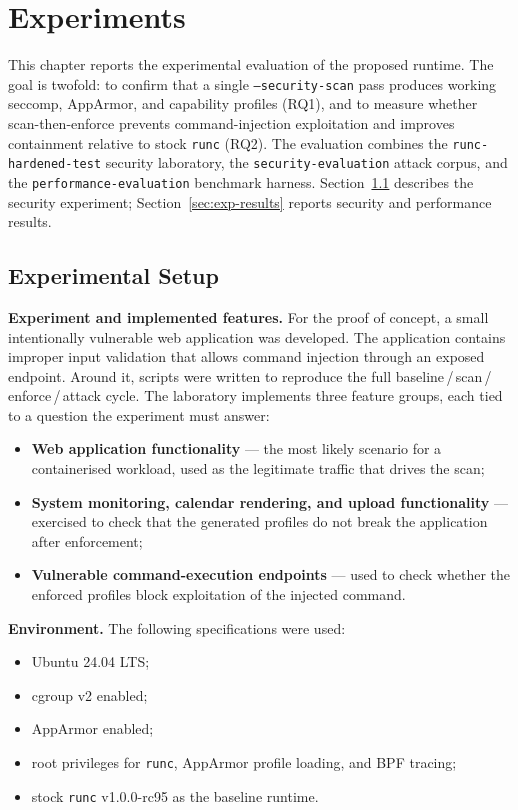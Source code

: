 
\chapter{Experiments}\label{ch:experiments}

This chapter reports the experimental evaluation of the proposed runtime. The goal is twofold: to confirm that a single \texttt{--security-scan} pass produces working seccomp, AppArmor, and capability profiles (RQ1), and to measure whether scan-then-enforce prevents command-injection exploitation and improves containment relative to stock \texttt{runc} (RQ2). The evaluation combines the \texttt{runc-hardened-test} security laboratory, the \texttt{security-evaluation} attack corpus, and the \texttt{performance-evaluation} benchmark harness. Section~\ref{sec:exp-setup} describes the security experiment; Section~\ref{sec:exp-results} reports security and performance results.

\section{Experimental Setup}\label{sec:exp-setup}

\textbf{Experiment and implemented features.} For the proof of concept, a small intentionally vulnerable web application was developed. The application contains improper input validation that allows command injection through an exposed endpoint. Around it, scripts were written to reproduce the full baseline\,/\,scan\,/\,enforce\,/\,attack cycle. The laboratory implements three feature groups, each tied to a question the experiment must answer:

\begin{itemize}
    \item \textbf{Web application functionality} --- the most likely scenario for a containerised workload, used as the legitimate traffic that drives the scan;
    \item \textbf{System monitoring, calendar rendering, and upload functionality} --- exercised to check that the generated profiles do not break the application after enforcement;
    \item \textbf{Vulnerable command-execution endpoints} --- used to check whether the enforced profiles block exploitation of the injected command.
\end{itemize}

\textbf{Environment.} The following specifications were used:

\begin{itemize}
    \item Ubuntu 24.04 LTS;
    \item cgroup v2 enabled;
    \item AppArmor enabled;
    \item root privileges for \texttt{runc}, AppArmor profile loading, and BPF tracing;
    \item stock \texttt{runc} v1.0.0-rc95 as the baseline runtime.
\end{itemize}


